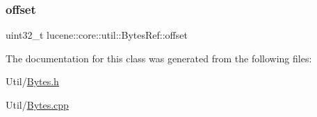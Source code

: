 \mbox{\label{classlucene_1_1core_1_1util_1_1BytesRef_a00b5e81a37602c7af1fde636cd44f12b}} 
\subsubsection{\texorpdfstring{offset}{offset}}
{\footnotesize\ttfamily uint32\+\_\+t lucene\+::core\+::util\+::\+Bytes\+Ref\+::offset}



The documentation for this class was generated from the following files\+:\begin{DoxyCompactItemize}
\item 
Util/\mbox{\hyperlink{Bytes_8h}{Bytes.\+h}}\item 
Util/\mbox{\hyperlink{Bytes_8cpp}{Bytes.\+cpp}}\end{DoxyCompactItemize}
